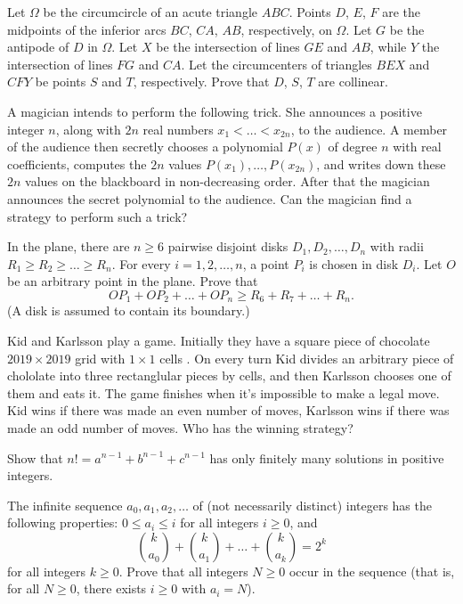 \documentclass[11pt]{scrartcl}
\begin{document}
\begin{problem}[607556370102952]
Let $\Omega$ be the circumcircle of an acute triangle $ABC$. Points $D$, $E$, $F$ are the midpoints of the inferior arcs $BC$, $CA$, $AB$, respectively, on $\Omega$. Let $G$ be the antipode of $D$ in $\Omega$. Let $X$ be the intersection of lines $GE$ and $AB$, while $Y$ the intersection of lines $FG$ and $CA$. Let the circumcenters of triangles $BEX$ and $CFY$ be points $S$ and $T$, respectively. Prove that $D$, $S$, $T$ are collinear.
\end{problem}
\begin{problem}[448881061747528]
A magician intends to perform the following trick. She announces a positive integer $n$, along with $2n$ real numbers $x_1 < \dots < x_{2n}$, to the audience. A member of the audience then secretly chooses a polynomial $P(x)$ of degree $n$ with real coefficients, computes the $2n$ values $P(x_1), \dots , P(x_{2n})$, and writes down these $2n$ values on the blackboard in non-decreasing order. After that the magician announces the secret polynomial to the audience. Can the magician find a strategy to perform such a trick?
\end{problem}
\begin{problem}[6654677204410680146]
In the plane, there are $n \geqslant 6$ pairwise disjoint disks $D_{1}, D_{2}, \ldots, D_{n}$ with radii $R_{1} \geqslant R_{2} \geqslant \ldots \geqslant R_{n}$. For every $i=1,2, \ldots, n$, a point $P_{i}$ is chosen in disk $D_{i}$. Let $O$ be an arbitrary point in the plane. Prove that\[O P_{1}+O P_{2}+\ldots+O P_{n} \geqslant R_{6}+R_{7}+\ldots+R_{n}.\](A disk is assumed to contain its boundary.)
\end{problem}
\begin{problem}[300334293164389]
	Kid and Karlsson play a game. Initially they have a square piece of chocolate $2019\times 2019$ grid with $1\times 1$ cells . On every turn Kid divides an arbitrary piece of chololate into three rectanglular pieces by cells, and then Karlsson chooses one of them and eats it. The game finishes when it's impossible to make a legal move. Kid wins if there was made an even number of moves, Karlsson wins if there was made an odd number of moves.
Who has the winning strategy?
\end{problem}
\begin{problem}[599825051147866097]
Show that $n!=a^{n-1}+b^{n-1}+c^{n-1}$ has only finitely many solutions in positive integers.
\end{problem}
\begin{problem}[2134021625648303394]
The infinite sequence $a_0,a _1, a_2, \dots$ of (not necessarily distinct) integers has the following properties: $0\le a_i \le i$ for all integers $i\ge 0$, and\[\binom{k}{a_0} + \binom{k}{a_1} + \dots + \binom{k}{a_k} = 2^k\]for all integers $k\ge 0$. Prove that all integers $N\ge 0$ occur in the sequence (that is, for all $N\ge 0$, there exists $i\ge 0$ with $a_i=N$).
\end{problem}
\end{document}
